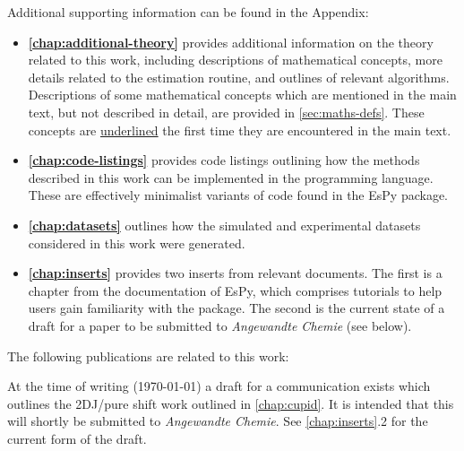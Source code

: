 Additional supporting information can be found in the Appendix:
\begin{itemize}
    \item \textbf{\cref{chap:additional-theory}} provides additional
        information on the theory related to this work, including descriptions
        of mathematical concepts, more details related to the estimation
        routine, and outlines of relevant algorithms. Descriptions of some
        mathematical concepts which are mentioned in the main text, but not
        described in detail, are provided in \cref{sec:maths-defs}. These
        concepts are \underline{underlined} the first time they are encountered
        in the main text.
    \item \textbf{\cref{chap:code-listings}} provides code listings outlining
        how the methods described in this work can be implemented in the
        \Python programming language.
        These are effectively minimalist variants of code found in the
        \ac{EsPy} package.
    \item \textbf{\cref{chap:datasets}} outlines how the simulated and
        experimental datasets considered in this work were generated.
    \item \textbf{\cref{chap:inserts}} provides two inserts from relevant
        documents. The first is a chapter from the documentation of \ac{EsPy},
        which comprises tutorials to help users gain familiarity with the
        package. The second is the current state of a draft for a paper to be
        submitted to \textit{Angewandte Chemie} (see below).
\end{itemize}

The following publications are related to this work:


At the time of writing (\today) a draft for a communication exists which
outlines the \ac{2DJ}/pure shift work outlined in \cref{chap:cupid}. It is
intended that this will shortly be submitted to \textit{Angewandte Chemie}.
See \cref{chap:inserts}.2 for the current form of the draft.
